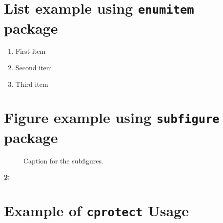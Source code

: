 \documentclass[]{article}
\begin{document}
\section{List example using \texttt{enumitem} package}

\begin{enumerate}[label=\roman*.]
    \item First item
    \item Second item
    \item Third item
\end{enumerate}

\section{Figure example using \texttt{subfigure} package}

\begin{figure}[!ht]
    \centering
    \caption{Caption for the subfigures.}
\end{figure}

\vspace{5mm}\noindent\textbf{2:}

\section{Example of \texorpdfstring{\texttt{cprotect}}{cprotect} Usage}
\end{document}
